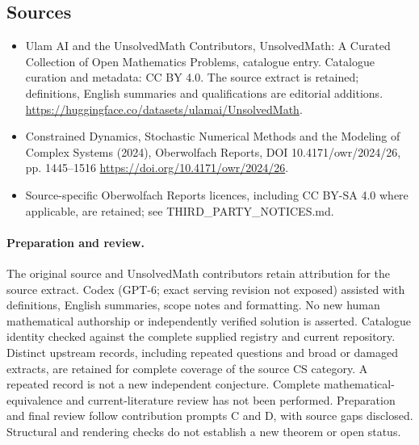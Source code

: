 \documentclass[11pt]{article}
\begin{document}
\subsection{Sources}
\begin{itemize}
\item[\hypertarget{source:statement:1}{S1}] Ulam AI and the UnsolvedMath Contributors, UnsolvedMath: A Curated Collection of Open Mathematics Problems, catalogue entry. Catalogue curation and metadata: CC BY 4.0. The source extract is retained; definitions, English summaries and qualifications are editorial additions.
\url{https://huggingface.co/datasets/ulamai/UnsolvedMath}.
\item[\hypertarget{source:statement:2}{S2}] Constrained Dynamics, Stochastic Numerical Methods and the Modeling of Complex Systems (2024), Oberwolfach Reports, DOI 10.4171/owr/2024/26, pp. 1445--1516
\url{https://doi.org/10.4171/owr/2024/26}.
\item Source-specific Oberwolfach Reports licences, including CC BY-SA 4.0 where applicable, are retained; see THIRD\_PARTY\_NOTICES.md.
\end{itemize}
\paragraph{Preparation and review.}
The original source and UnsolvedMath contributors retain attribution for the source extract. Codex (GPT-6; exact serving revision not exposed) assisted with definitions, English summaries, scope notes and formatting. No new human mathematical authorship or independently verified solution is asserted. Catalogue identity checked against the complete supplied registry and current repository. Distinct upstream records, including repeated questions and broad or damaged extracts, are retained for complete coverage of the source CS category. A repeated record is not a new independent conjecture. Complete mathematical-equivalence and current-literature review has not been performed. Preparation and final review follow contribution prompts C and D, with source gaps disclosed. Structural and rendering checks do not establish a new theorem or open status.
\label{end:statement}
\end{document}
